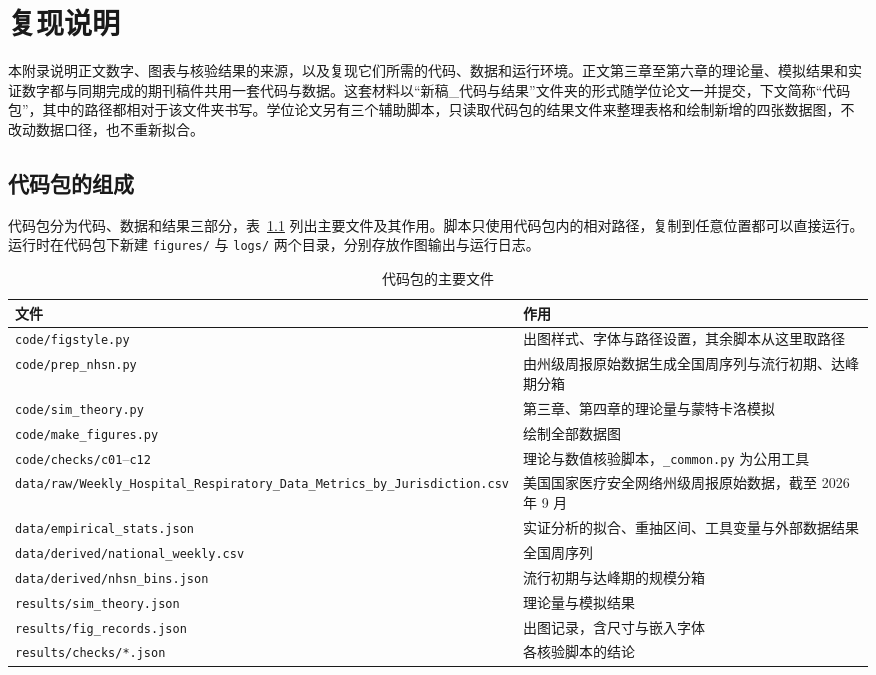 \chapter{复现说明}
\label{chap:repro}

本附录说明正文数字、图表与核验结果的来源，以及复现它们所需的代码、数据和运行环境。正文第三章至第六章的理论量、模拟结果和实证数字都与同期完成的期刊稿件共用一套代码与数据。这套材料以“新稿\_代码与结果”文件夹的形式随学位论文一并提交，下文简称“代码包”，其中的路径都相对于该文件夹书写。学位论文另有三个辅助脚本，只读取代码包的结果文件来整理表格和绘制新增的四张数据图，不改动数据口径，也不重新拟合。

\section{代码包的组成}
\label{app:repro-layout}

代码包分为代码、数据和结果三部分，表~\ref{tab:repro-files} 列出主要文件及其作用。脚本只使用代码包内的相对路径，复制到任意位置都可以直接运行。运行时在代码包下新建 \nolinkurl{figures/} 与 \nolinkurl{logs/} 两个目录，分别存放作图输出与运行日志。

\begin{table}[!htbp]
  \centering
  \caption{代码包的主要文件}
  \label{tab:repro-files}
  \small
  \begin{tabularx}{\textwidth}{@{}>{\raggedright\arraybackslash}p{}X@{}}
    \toprule
    文件 & 作用 \\
    \midrule
    \nolinkurl{code/figstyle.py} & 出图样式、字体与路径设置，其余脚本从这里取路径 \\
    \nolinkurl{code/prep_nhsn.py} & 由州级周报原始数据生成全国周序列与流行初期、达峰期分箱 \\
    \nolinkurl{code/sim_theory.py} & 第三章、第四章的理论量与蒙特卡洛模拟 \\
    \nolinkurl{code/make_figures.py} & 绘制全部数据图 \\
    \nolinkurl{code/checks/c01}--\nolinkurl{c12} & 理论与数值核验脚本，\nolinkurl{_common.py} 为公用工具 \\
    \nolinkurl{data/raw/Weekly_Hospital_Respiratory_Data_Metrics_by_Jurisdiction.csv} & 美国国家医疗安全网络州级周报原始数据，截至 2026 年 9 月 \\
    \nolinkurl{data/empirical_stats.json} & 实证分析的拟合、重抽区间、工具变量与外部数据结果 \\
    \nolinkurl{data/derived/national_weekly.csv} & 全国周序列 \\
    \nolinkurl{data/derived/nhsn_bins.json} & 流行初期与达峰期的规模分箱 \\
    \nolinkurl{results/sim_theory.json} & 理论量与模拟结果 \\
    \nolinkurl{results/fig_records.json} & 出图记录，含尺寸与嵌入字体 \\
    \nolinkurl{results/checks/*.json} & 各核验脚本的结论 \\
    \bottomrule
  \end{tabularx}
\end{table}

